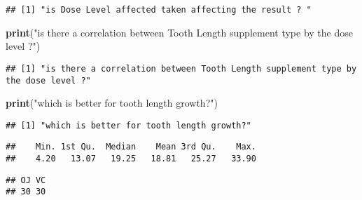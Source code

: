 \documentclass[
]{article}
\newenvironment{Shaded}{\begin{snugshade}}{\end{snugshade}}
\newcommand{\CommentTok}[1]{\textcolor[rgb]{0.56,0.35,0.01}{\textit{#1}}}
\newcommand{\KeywordTok}[1]{\textcolor[rgb]{0.13,0.29,0.53}{\textbf{#1}}}
\newcommand{\NormalTok}[1]{#1}
\newcommand{\OperatorTok}[1]{\textcolor[rgb]{0.81,0.36,0.00}{\textbf{#1}}}
\newcommand{\StringTok}[1]{\textcolor[rgb]{0.31,0.60,0.02}{#1}}
\begin{document}
\begin{verbatim}
## [1] "is Dose Level affected taken affecting the result ? "
\end{verbatim}

\begin{Shaded}
\begin{Highlighting}[]
\KeywordTok{print}\NormalTok{(}\StringTok{"is there a correlation between Tooth Length supplement type by the dose level ?"}\NormalTok{)}
\end{Highlighting}
\end{Shaded}

\begin{verbatim}
## [1] "is there a correlation between Tooth Length supplement type by the dose level ?"
\end{verbatim}

\begin{Shaded}
\begin{Highlighting}[]
\KeywordTok{print}\NormalTok{(}\StringTok{"which is better for tooth length growth?"}\NormalTok{)}
\end{Highlighting}
\end{Shaded}

\begin{verbatim}
## [1] "which is better for tooth length growth?"
\end{verbatim}

\begin{Shaded}
\end{Shaded}

\begin{verbatim}
##    Min. 1st Qu.  Median    Mean 3rd Qu.    Max. 
##    4.20   13.07   19.25   18.81   25.27   33.90
\end{verbatim}

\begin{Shaded}
\end{Shaded}

\begin{verbatim}
## OJ VC 
## 30 30
\end{verbatim}

\begin{Shaded}
\end{Shaded}
\end{document}

